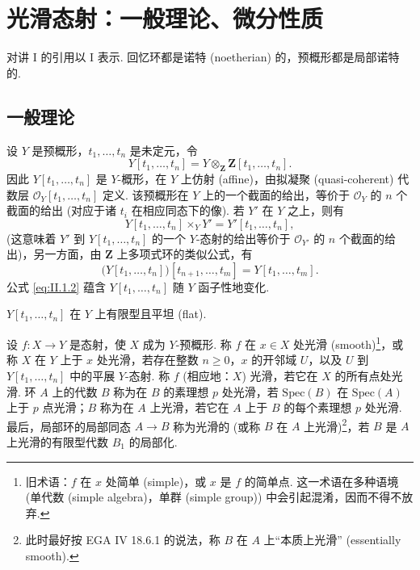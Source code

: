 \chapter{光滑态射：一般理论、微分性质}

对讲 I 的引用以 I 表示. 回忆环都是诺特 (noetherian) 的，预概形都是局部诺特的.

\section{一般理论}

设 $Y$ 是预概形，$t_1, \dots, t_n$ 是未定元，令
\begin{equation}
Y[t_1, \dots, t_n] = Y \otimes_{\mathbf{Z}} \mathbf{Z}[t_1, \dots, t_n]. \tag{1.1}
\label{eq:II.1.1}
\end{equation}
因此 $Y[t_1, \dots, t_n]$ 是 $Y$-概形，在 $Y$ 上仿射 (affine)，由拟凝聚 (quasi-coherent) 代数层 $\mathcal{O}_Y[t_1, \dots, t_n]$ 定义. 该预概形在 $Y$ 上的一个截面的给出，等价于 $\mathcal{O}_Y$ 的 $n$ 个截面的给出 (对应于诸 $t_i$ 在相应同态下的像). 若 $Y'$ 在 $Y$ 之上，则有
\begin{equation}
Y[t_1, \dots, t_n] \times_Y Y' = Y'[t_1, \dots, t_n], \tag{1.2}
\label{eq:II.1.2}
\end{equation}
(这意味着 $Y'$ 到 $Y[t_1, \dots, t_n]$ 的一个 $Y$-态射的给出等价于 $\mathcal{O}_{Y'}$ 的 $n$ 个截面的给出)，另一方面，由 $\mathbf{Z}$ 上多项式环的类似公式，有
\begin{equation}
\bigl(Y[t_1, \dots, t_n]\bigr)[t_{n+1}, \dots, t_m] = Y[t_1, \dots, t_m]. \tag{1.3}
\label{eq:II.1.3}
\end{equation}
公式 \eqref{eq:II.1.2} 蕴含 $Y[t_1, \dots, t_n]$ 随 $Y$ 函子性地变化.

$Y[t_1, \dots, t_n]$ 在 $Y$ 上有限型且平坦 (flat).

\begin{definition}\label{def:II.1.1}
设 $f \colon X \to Y$ 是态射，使 $X$ 成为 $Y$-预概形. 称 $f$ 在 $x \in X$ 处光滑 (smooth)\footnote{旧术语：$f$ 在 $x$ 处简单 (simple)，或 $x$ 是 $f$ 的简单点. 这一术语在多种语境 (单代数 (simple algebra)，单群 (simple group)) 中会引起混淆，因而不得不放弃.}，或称 $X$ 在 $Y$ 上于 $x$ 处光滑，若存在整数 $n \geqslant 0$，$x$ 的开邻域 $U$，以及 $U$ 到 $Y[t_1, \dots, t_n]$ 中的平展 $Y$-态射. 称 $f$ (相应地：$X$) 光滑，若它在 $X$ 的所有点处光滑. 环 $A$ 上的代数 $B$ 称为在 $B$ 的素理想 $p$ 处光滑，若 $\mathrm{Spec}(B)$ 在 $\mathrm{Spec}(A)$ 上于 $p$ 点光滑；$B$ 称为在 $A$ 上光滑，若它在 $A$ 上于 $B$ 的每个素理想 $p$ 处光滑. 最后，局部环的局部同态 $A \to B$ 称为光滑的 (或称 $B$ 在 $A$ 上光滑)\footnote{此时最好按 EGA IV 18.6.1 的说法，称 $B$ 在 $A$ 上``本质上光滑'' (essentially smooth).}，若 $B$ 是 $A$ 上光滑的有限型代数 $B_1$ 的局部化.
\end{definition}

